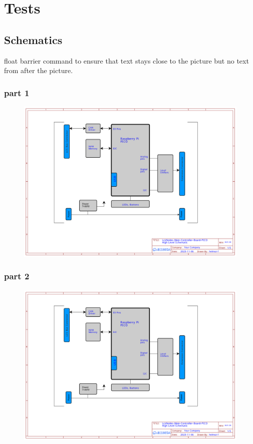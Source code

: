 \chapter{Tests}

\section{Schematics}

float barrier command to ensure that text stays close to the picture but no text from after the picture.

\subsection{part 1}

\begin{figure}[ht]
    \centering
    \includegraphics[page=1, width=\textwidth]{./schematics/Schematic_LcsNodes-Main-Controller-Board.pdf}
\end{figure}

\FloatBarrier

\subsection{part 2}
\begin{figure}[ht]
    \centering
    \includegraphics[page=2, width=\textwidth]{./schematics/Schematic_LcsNodes-Main-Controller-Board.pdf}
\end{figure}

